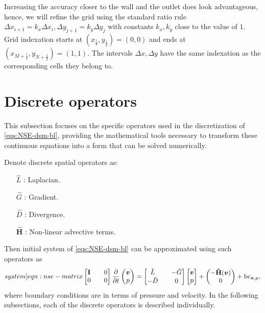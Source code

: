 \documentclass{article}
\numberwithin{equation}{section}
\begin{document}
Increasing the accuracy closer to the wall and the outlet does look advantageous, hence, we will refine the grid using the standard ratio rule $\Delta x_{i+1}=k_x\Delta x_i,\Delta y_{j+1}=k_y\Delta y_j$ with constants $k_x,k_y$ close to the value of $1$. Grid indexation starts at $(x_{\frac{1}{2}},y_{\frac{1}{2}})=(0,0)$ and ends at $(x_{M+\frac{1}{2}},y_{N+\frac{1}{2}})=(1,1)$. The intervals $\Delta x, \Delta y$ have the same indexation as the corresponding cells they belong to. 


\pagebreak
\section{Discrete operators}

This subsection focuses on the specific operators used in the discretization of \cref{eqs:NSE-dsm-bl}, providing the mathematical tools necessary to transform these continuous equations into a form that can be solved numerically.

Denote discrete spatial operators as:
\begin{enumerate}
	\item[$\hat{L}$]:  Laplacian.
	\item[$\hat{G}$]: Gradient.
	\item[$\hat{D}$]: Divergence.
	\item[$\mathbf{\hat{H}}$]: Non-linear advective terms.
\end{enumerate}
Then initial system of \cref{eqs:NSE-dsm-bl} can be approximated using such operators as
\begin{equation}\label[system]{eqn:nse-matrix}
            \begin{bmatrix}
                  \mathbf{I} && 0 \\ 
                  0 && 0
            \end{bmatrix}
            \frac{\partial }{\partial t} 
            \begin{pmatrix}
                  \boldsymbol{v} \\ 
                  p
            \end{pmatrix}
            =
            \begin{bmatrix}
                  \hat{L} && - \hat{G} \\ 
                  -\hat{D} && 0
            \end{bmatrix}
            \begin{bmatrix}
                  \boldsymbol{v} \\
                  p
            \end{bmatrix}
            +
            \begin{pmatrix}
                  -\mathbf{\hat{H}}(\boldsymbol{v})\\
                  0
            \end{pmatrix} + \text{bc}_{\boldsymbol{v},p},
        \end{equation}
where boundary conditions are in terms of pressure and velocity. In the following subsections, each of the discrete operators is described individually. 
\end{document}
